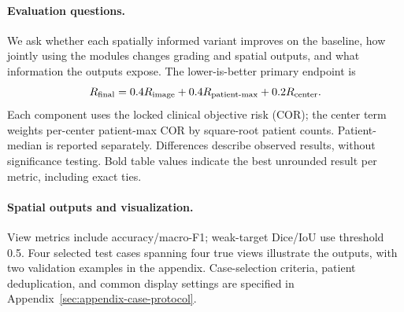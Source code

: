 \paragraph{Evaluation questions.}
We ask whether each spatially informed variant improves on the baseline, how jointly using the modules changes grading and spatial outputs, and what information the outputs expose. The lower-is-better primary endpoint is
\begin{equation}
R_{\mathrm{final}}=0.4R_{\mathrm{image}}+0.4R_{\mathrm{patient\text{-}max}}+0.2R_{\mathrm{center}} .
\label{eq:risk}
\end{equation}
Each component uses the locked clinical objective risk (COR); the center term weights per-center patient-max COR by square-root patient counts. Patient-median is reported separately. Differences describe observed results, without significance testing. Bold table values indicate the best unrounded result per metric, including exact ties.

\paragraph{Spatial outputs and visualization.}
View metrics include accuracy/macro-F1; weak-target Dice/IoU use threshold 0.5. Four selected test cases spanning four true views illustrate the outputs, with two validation examples in the appendix. Case-selection criteria, patient deduplication, and common display settings are specified in Appendix~\ref{sec:appendix-case-protocol}.
